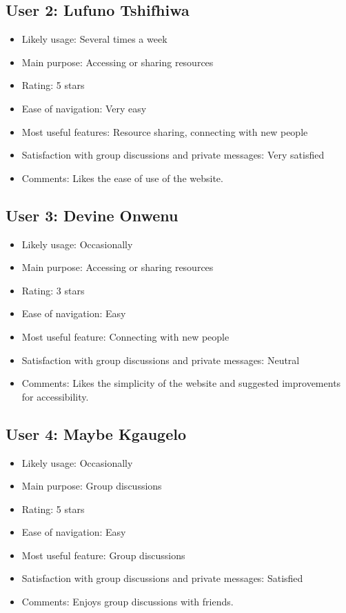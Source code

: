 \subsection*{User 2: Lufuno Tshifhiwa}
\begin{itemize}
    \item Likely usage: Several times a week
    \item Main purpose: Accessing or sharing resources
    \item Rating: 5 stars
    \item Ease of navigation: Very easy
    \item Most useful features: Resource sharing, connecting with new people
    \item Satisfaction with group discussions and private messages: Very satisfied
    \item Comments: Likes the ease of use of the website.
\end{itemize}

\subsection*{User 3: Devine Onwenu}
\begin{itemize}
    \item Likely usage: Occasionally
    \item Main purpose: Accessing or sharing resources
    \item Rating: 3 stars
    \item Ease of navigation: Easy
    \item Most useful feature: Connecting with new people
    \item Satisfaction with group discussions and private messages: Neutral
    \item Comments: Likes the simplicity of the website and suggested improvements for accessibility.
\end{itemize}

\subsection*{User 4: Maybe Kgaugelo}
\begin{itemize}
    \item Likely usage: Occasionally
    \item Main purpose: Group discussions
    \item Rating: 5 stars
    \item Ease of navigation: Easy
    \item Most useful feature: Group discussions
    \item Satisfaction with group discussions and private messages: Satisfied
    \item Comments: Enjoys group discussions with friends.
\end{itemize}

